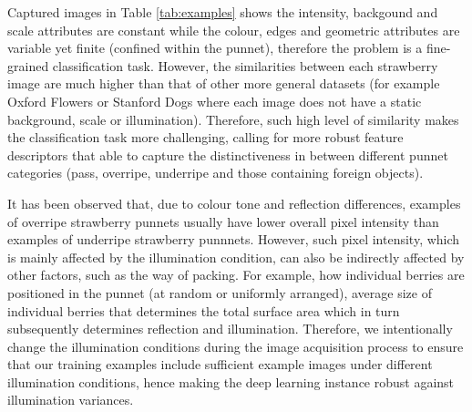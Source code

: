 \documentclass[fleqn,twoside]{article}
\begin{document}
Captured images in Table \ref{tab:examples} shows the intensity, backgound and scale attributes are constant while the colour, edges and geometric attributes are variable yet finite (confined within the punnet), therefore the problem is a fine-grained classification task. However, the similarities between each strawberry image are much higher than that of other more general datasets (for example Oxford Flowers or Stanford Dogs where each image does not have a static background, scale or illumination). Therefore, such high level of similarity makes the classification task more challenging, calling for more robust feature descriptors that able to capture the distinctiveness in between different punnet categories (pass, overripe, underripe and those containing foreign objects).

It has been observed that, due to colour tone and reflection differences, examples of overripe strawberry punnets usually have lower overall pixel intensity than examples of underripe strawberry punnnets. However, such pixel intensity, which is mainly affected by the illumination condition, can also be indirectly affected by other factors, such as the way of packing. For example, how individual berries are positioned in the punnet (at random or uniformly arranged), average size of individual berries that determines the total surface area which in turn subsequently determines reflection and illumination. Therefore, we intentionally change the illumination conditions during the image acquisition process to ensure that our training examples include sufficient example images under different illumination conditions, hence making the deep learning instance robust against illumination variances.
\end{document}

